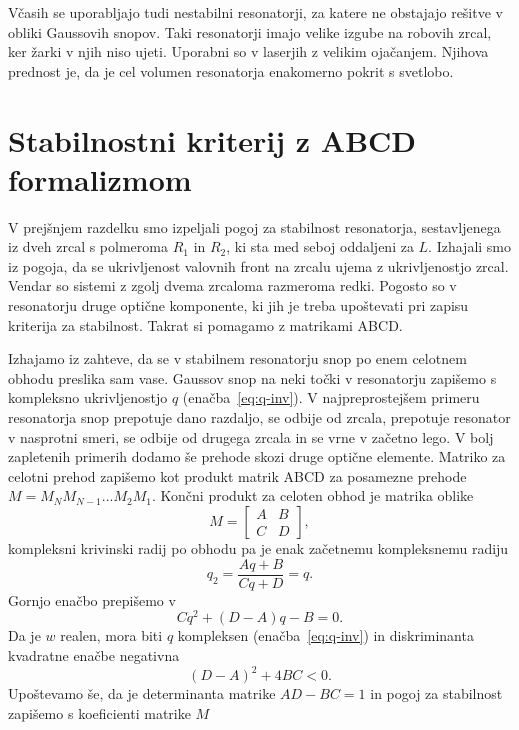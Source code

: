 \begin{remark}
Včasih se uporabljajo tudi nestabilni resonatorji, za 
katere ne obstajajo rešitve v obliki Gaussovih snopov. Taki resonatorji 
imajo velike izgube na robovih zrcal, ker žarki v njih niso ujeti. 
Uporabni so v laserjih z velikim ojačanjem. Njihova prednost je, da je cel
volumen resonatorja enakomerno pokrit s svetlobo.
\end{remark}

\section{Stabilnostni kriterij z ABCD formalizmom}
V prejšnjem razdelku smo izpeljali pogoj za stabilnost resonatorja, 
sestavljenega iz dveh zrcal s polmeroma $R_1$ in $R_2$, ki sta med 
seboj oddaljeni za $L$. Izhajali smo iz pogoja, da se ukrivljenost
valovnih front na zrcalu ujema z ukrivljenostjo zrcal. Vendar so sistemi z
zgolj dvema zrcaloma razmeroma redki. Pogosto so v resonatorju
druge optične komponente, ki jih je treba upoštevati pri zapisu
kriterija za stabilnost. Takrat si pomagamo z matrikami ABCD. 

Izhajamo iz zahteve, da se v stabilnem resonatorju snop po enem celotnem obhodu
preslika sam vase. Gaussov snop na neki točki v resonatorju 
zapišemo s kompleksno ukrivljenostjo $q$ (enačba~\ref{eq:q-inv}).
V najpreprostejšem primeru resonatorja snop prepotuje dano razdaljo, se odbije od zrcala, prepotuje
resonator v nasprotni smeri, se odbije od drugega zrcala in se vrne v začetno lego. V bolj 
zapletenih primerih dodamo še prehode skozi druge optične elemente. Matriko 
za celotni prehod zapišemo kot produkt matrik ABCD za posamezne prehode $M = M_N M_{N-1} ...M_2 M_1$.
Končni produkt za celoten obhod je matrika oblike
\begin{equation}
M = \left[\begin{array}{cc}
A & B\\
C & D
\end{array}\right],
\end{equation}
kompleksni krivinski radij po obhodu pa je enak začetnemu kompleksnemu radiju
\begin{equation}
q_2 = \frac{Aq+B}{Cq+D} = q.
\end{equation}
Gornjo enačbo prepišemo v 
\begin{equation}
Cq^2+(D-A)q-B=0.
\end{equation}
Da je $w$ realen, mora biti $q$ kompleksen (enačba~\ref{eq:q-inv}) 
in diskriminanta kvadratne enačbe negativna
\begin{equation}
(D-A)^2+ 4BC<0.
\end{equation}
Upoštevamo še, da je determinanta matrike $AD-BC=1$ in pogoj za 
stabilnost zapišemo s koeficienti matrike $M$

